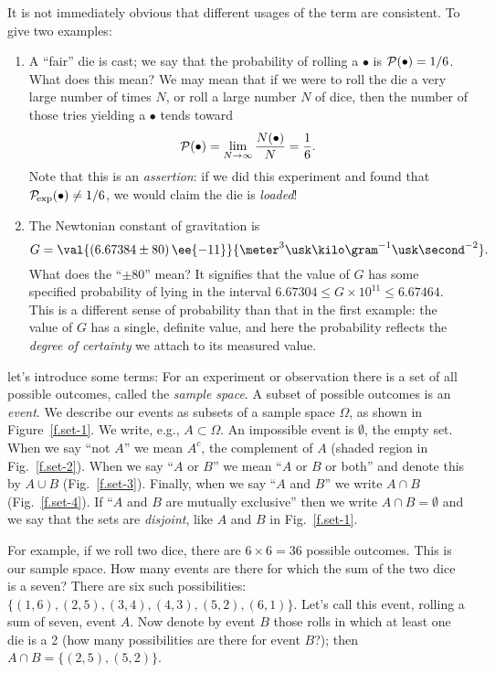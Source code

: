 It is not immediately obvious that different usages of the term are consistent. To give two examples:

\begin{enumerate}
\item A ``fair'' die is cast; we say that the probability of rolling a $\bullet$ is $\mathcal{P}(\bullet) = 1/6$.  What does this mean?  We may mean that if we were to roll the die a very large number of times $N$, or roll a large number $N$ of dice, then the number of those tries yielding a $\bullet$ tends toward
\[ \mathcal{P}(\bullet) = \lim_{N\to\infty} \frac{N(\bullet)}{N} = \frac{1}{6}. \]
Note that this is an \emph{assertion}: if we did this experiment and found that $\mathcal{P}_{\!\mathrm{exp}}(\bullet) \neq 1/6$, we would claim the die is \emph{loaded}!

\item The Newtonian constant of gravitation is
\[ G = \val{\left(6.67384\pm80\right)\ee{-11}}{\meter^{3}\usk\kilo\gram^{-1}\usk\second^{-2}}. \]
What does the ``$\pm80$'' mean? It signifies that the value of $G$ has some specified probability of lying in the interval $6.67304\leq G\times 10^{11} \leq 6.67464$.
This is a different sense of probability than that in the first example: the value of $G$ has a single, definite value, and here the probability reflects the \emph{degree of certainty} we attach to its measured value.
\end{enumerate}

 let's introduce some terms\cite{Durrett1994The-Essentials-}:
For an experiment or observation there is a set of all possible outcomes, called the 
\emph{sample space}. A subset of possible outcomes is an \emph{event}.
We describe our events as subsets of a sample space $\Omega$, as shown in Figure~\ref{f.set-1}.  We write, e.g., $A \subset \Omega$. An impossible event is $\emptyset$, the empty set.  When we say ``not $A$'' we mean $A^{c}$,  the complement of $A$ (shaded region in Fig.~\ref{f.set-2}).
When we say ``$A$ or $B$'' we mean ``$A$ or $B$ or both'' and denote this by $A\cup B$ (Fig.~\ref{f.set-3}).
Finally, when we say ``$A$ and $B$'' we write $A\cap B$ (Fig.~\ref{f.set-4}).  If ``$A$ and $B$ are mutually exclusive'' then we write $A\cap B =\emptyset$ and we say that the sets are 
\emph{disjoint}, like $A$ and $B$ in Fig.~\ref{f.set-1}.

For example, if we roll two dice, there are $6\times 6 = 36$ possible outcomes. This is our sample space.  How many events are there for which the sum of the two dice is a seven?  There are six such possibilities: $\{(1,6),(2,5),(3,4),(4,3),(5,2),(6,1)\}$. Let's call this event, rolling a sum of seven, event $A$. Now denote by event $B$ those rolls in which at least one die is a 2 (how many possibilities are there for event $B$?); then $A\cap B = \{(2,5),(5,2)\}$. 


